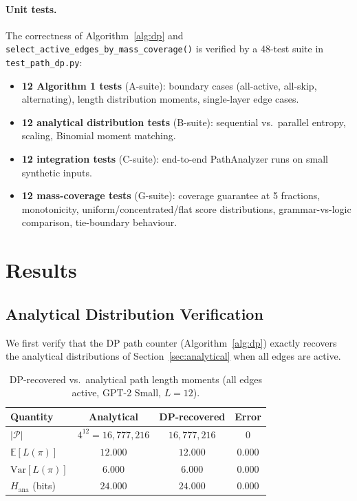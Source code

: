 \documentclass{article}
\newcommand{\E}{\mathbb{E}}
\newcommand{\Pcal}{\mathcal{P}}
\newcommand{\Hana}{H_{\mathrm{ana}}}
\begin{document}
\paragraph{Unit tests.}
The correctness of Algorithm~\ref{alg:dp} and \texttt{select\_active\_edges\_by\_mass\_coverage()} is verified by a 48-test suite in \texttt{test\_path\_dp.py}:
\begin{itemize}
  \item \textbf{12 Algorithm 1 tests} (A-suite): boundary cases (all-active, all-skip,
        alternating), length distribution moments, single-layer edge cases.
  \item \textbf{12 analytical distribution tests} (B-suite): sequential vs.\ parallel
        entropy, scaling, Binomial moment matching.
  \item \textbf{12 integration tests} (C-suite): end-to-end PathAnalyzer runs on
        small synthetic inputs.
  \item \textbf{12 mass-coverage tests} (G-suite): coverage guarantee at 5 fractions,
        monotonicity, uniform/concentrated/flat score distributions, grammar-vs-logic
        comparison, tie-boundary behaviour.
\end{itemize}

\section{Results}
\label{sec:results}

\subsection{Analytical Distribution Verification}

We first verify that the DP path counter (Algorithm~\ref{alg:dp}) exactly recovers
the analytical distributions of Section~\ref{sec:analytical} when all edges are active.

\begin{table}[h]
  \centering
  \caption{DP-recovered vs.\ analytical path length moments (all edges active, GPT-2 Small, $L=12$).}
  \label{tab:verify}
  \begin{tabular}{lccc}
    \toprule
    Quantity & Analytical & DP-recovered & Error \\
    \midrule
    $|\Pcal|$                 & $4^{12} = 16{,}777{,}216$ & $16{,}777{,}216$ & 0 \\
    $\E[L(\pi)]$              & $12.000$                  & $12.000$        & $0.000$ \\
    $\mathrm{Var}[L(\pi)]$    & $6.000$                   & $6.000$         & $0.000$ \\
    $\Hana$ (bits)            & $24.000$                  & $24.000$        & $0.000$ \\
    \bottomrule
  \end{tabular}
\end{table}
\end{document}
